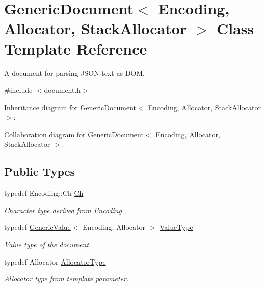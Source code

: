 \hypertarget{class_generic_document}{}\section{Generic\+Document$<$ Encoding, Allocator, Stack\+Allocator $>$ Class Template Reference}
\label{class_generic_document}


A document for parsing J\+S\+ON text as D\+OM.  




{\ttfamily \#include $<$document.\+h$>$}



Inheritance diagram for Generic\+Document$<$ Encoding, Allocator, Stack\+Allocator $>$\+:


Collaboration diagram for Generic\+Document$<$ Encoding, Allocator, Stack\+Allocator $>$\+:
\subsection*{Public Types}
\begin{DoxyCompactItemize}
\item 
\mbox{\label{class_generic_document_a6f5b0b7b6626508d094ae67490269700}} 
typedef Encoding\+::\+Ch \hyperlink{class_generic_document_a6f5b0b7b6626508d094ae67490269700}{Ch}
\begin{DoxyCompactList}\small\item\em Character type derived from Encoding. \end{DoxyCompactList}\item 
\mbox{\label{class_generic_document_a8936205dc215dda029060d7e835e0549}} 
typedef \hyperlink{class_generic_value}{Generic\+Value}$<$ Encoding, Allocator $>$ \hyperlink{class_generic_document_a8936205dc215dda029060d7e835e0549}{Value\+Type}
\begin{DoxyCompactList}\small\item\em Value type of the document. \end{DoxyCompactList}\item 
\mbox{\label{class_generic_document_a35155b912da66ced38d22e2551364c57}} 
typedef Allocator \hyperlink{class_generic_document_a35155b912da66ced38d22e2551364c57}{Allocator\+Type}
\begin{DoxyCompactList}\small\item\em Allocator type from template parameter. \end{DoxyCompactList}\end{DoxyCompactItemize}
